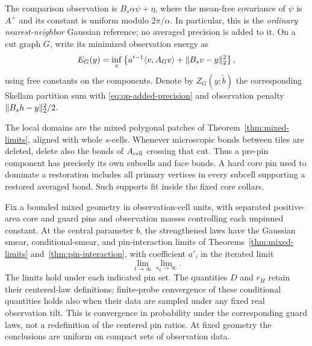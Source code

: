 The comparison observation is \(B_s\alpha\psi+\eta\), where the
mean-free covariance of \(\psi\) is \(A^+\) and its constant is
uniform modulo \(2\pi/\alpha\).  In particular, this is the
\emph{ordinary nearest-neighbor} Gaussian reference; no averaged
precision is added to it.  On a cut graph \(G\), write its minimized
observation energy as
\begin{equation}\label{eq:op-observation-energy}
 E_G(y)=\inf_v\left\{a'^{-1}\langle v,A_Gv\rangle
                         +\lVert B_sv-y\rVert_2^2\right\},
\end{equation}
using free constants on the components.  Denote by \(Z_G(y;\widetilde b)\)
the corresponding Skellam partition sum with
\eqref{eq:op-added-precision} and observation penalty
\(\lVert B_sh-y\rVert_2^2/2\).

The local domains are the mixed polygonal patches of
Theorem~\ref{thm:mixed-limits}, aligned with whole \(s\)-cells.
Whenever microscopic bonds between tiles are deleted, delete also
the bonds of \(A_{\rm cell}\) crossing that cut.  Thus a pre-pin
component has precisely its own subcells and face bonds.  A hard
core pin used to dominate a restoration includes all primary
vertices in every subcell supporting a restored averaged bond.
Such supports fit inside the fixed core collars.

\begin{lemma}\label{lem:op-local-limits}
Fix a bounded mixed geometry in observation-cell units, with
separated positive-area core and guard pins and observation masses
controlling each unpinned constant.  At the central parameter \(b\),
the strengthened laws have the Gaussian smear, conditional-smear,
and pin-interaction limits of Theorems~\ref{thm:mixed-limits}
and~\ref{thm:pin-interaction}, with coefficient \(a'\), in the
iterated limit
\[
             \lim_{t\to\infty}\lim_{s_0\to\infty}.
\]
The limits hold under each indicated pin set.  The quantities
\(D\) and \(r_H\) retain their centered-law definitions;
finite-probe convergence of these conditional quantities holds
also when their data are sampled under any fixed real observation
tilt.  This is convergence in probability under the corresponding
guard laws, not a redefinition of the centered pin ratios.
At fixed geometry the conclusions are uniform on compact sets of
observation data.
\end{lemma}

